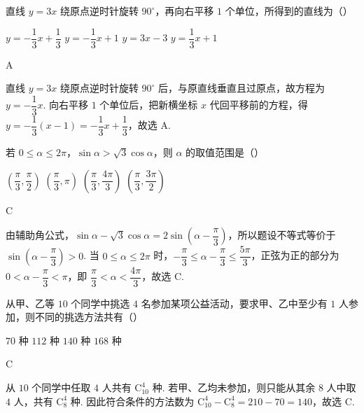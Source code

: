 \begin{problem}
直线 \(y=3x\) 绕原点逆时针旋转 \(90^{\circ}\)，再向右平移 \(1\) 个单位，所得到的直线为（\quad）

\choices
    {\(y=-\dfrac13x+\dfrac13\)}
    {\(y=-\dfrac13x+1\)}
    {\(y=3x-3\)}
    {\(y=\dfrac13x+1\)}
\end{problem}

\begin{answer}
A
\end{answer}

\begin{solution}
直线 \(y=3x\) 绕原点逆时针旋转 \(90^{\circ}\) 后，与原直线垂直且过原点，故方程为 \(y=-\dfrac13x\). 向右平移 \(1\) 个单位后，把新横坐标 \(x\) 代回平移前的方程，得 \(y=-\dfrac13(x-1)=-\dfrac13x+\dfrac13\)，故选 A.
\end{solution}

\begin{problem}
若 \(0\leqslant\alpha\leqslant2\pi\)，\(\sin\alpha>\sqrt3\cos\alpha\)，则 \(\alpha\) 的取值范围是（\quad）

\choices
    {\(\left(\dfrac\pi3,\dfrac\pi2\right)\)}
    {\(\left(\dfrac\pi3,\pi\right)\)}
    {\(\left(\dfrac\pi3,\dfrac{4\pi}3\right)\)}
    {\(\left(\dfrac\pi3,\dfrac{3\pi}2\right)\)}
\end{problem}

\begin{answer}
C
\end{answer}

\begin{solution}
由辅助角公式，\(\sin\alpha-\sqrt3\cos\alpha=2\sin\left(\alpha-\dfrac\pi3\right)\)，所以题设不等式等价于 \(\sin\left(\alpha-\dfrac\pi3\right)>0\). 当 \(0\leqslant\alpha\leqslant2\pi\) 时，\(-\dfrac\pi3\leqslant\alpha-\dfrac\pi3\leqslant\dfrac{5\pi}3\)，正弦为正的部分为 \(0<\alpha-\dfrac\pi3<\pi\)，即 \(\dfrac\pi3<\alpha<\dfrac{4\pi}3\)，故选 C.
\end{solution}

\begin{problem}
从甲、乙等 \(10\) 个同学中挑选 \(4\) 名参加某项公益活动，要求甲、乙中至少有 \(1\) 人参加，则不同的挑选方法共有（\quad）

\choices
    {\(70\) 种}
    {\(112\) 种}
    {\(140\) 种}
    {\(168\) 种}
\end{problem}

\begin{answer}
C
\end{answer}

\begin{solution}
从 \(10\) 个同学中任取 \(4\) 人共有 \(\mathrm C_{10}^{4}\) 种. 若甲、乙均未参加，则只能从其余 \(8\) 人中取 \(4\) 人，共有 \(\mathrm C_{8}^{4}\) 种. 因此符合条件的方法数为 \(\mathrm C_{10}^{4}-\mathrm C_{8}^{4}=210-70=140\)，故选 C.
\end{solution}

